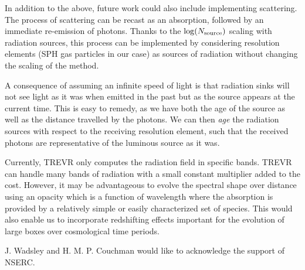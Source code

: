 \documentclass[fleq,usenatbib]{mnras}
\newcommand{\acro}{TREVR}
\newcommand{\NS}{N_{\rm source}}
\begin{document}
{In addition to the above, future work could also include implementing 
scattering.  The process of scattering can be recast as an absorption, 
followed by an immediate re-emission of photons. Thanks to the $\log(\NS)$ 
scaling with radiation sources, this process can be implemented by considering 
resolution elements (SPH gas particles in our case) as sources of radiation 
without changing the scaling of the method.

A consequence of assuming an infinite speed of light is that radiation sinks 
will not see light as it was when emitted in the past but as the source appears
at the current time.  This is easy to remedy, as we have both the age of the 
source as well as the distance travelled by the photons. We can then 
\textit{age} the radiation sources with respect to the receiving resolution 
element, such that the received photons are representative of the luminous 
source as it was.

Currently, \acro{} only computes the radiation field in specific bands. 
\acro{} can handle many bands of radiation with a small constant multiplier 
added to the cost.  However, it may be advantageous to evolve the spectral 
shape over distance using an opacity which is a function of wavelength where the 
absorption is provided by a relatively simple or easily characterized set of 
species. This would also enable us to incorporate redshifting effects 
important for the evolution of large boxes over cosmological time periods.

J. Wadsley and H. M. P. Couchman would like to acknowledge the support of 
NSERC.







\appendix
}
\end{document}
